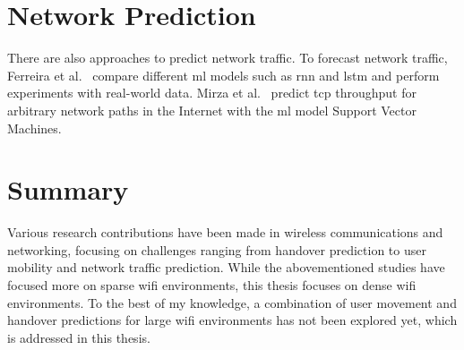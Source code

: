 \section{Network Prediction}

There are also approaches to predict network traffic.
To forecast network traffic, Ferreira et al.~\cite{ferreiraForecastingNetworkTraffic2023} compare different \ac{ml} models such as \ac{rnn} and \ac{lstm} and perform experiments with real-world data.
Mirza et al.~\cite{mirzaMachineLearningApproach2007} predict \ac{tcp} throughput for arbitrary network paths in the Internet with the \ac{ml} model Support Vector Machines.

\section{Summary}
Various research contributions have been made in wireless communications and networking, focusing on challenges ranging from handover prediction to user mobility and network traffic prediction.
While the abovementioned studies have focused more on sparse \ac{wifi} environments, this thesis focuses on dense \ac{wifi} environments.
To the best of my knowledge, a combination of user movement and handover predictions for large \ac{wifi} environments has not been explored yet, which is addressed in this thesis.
